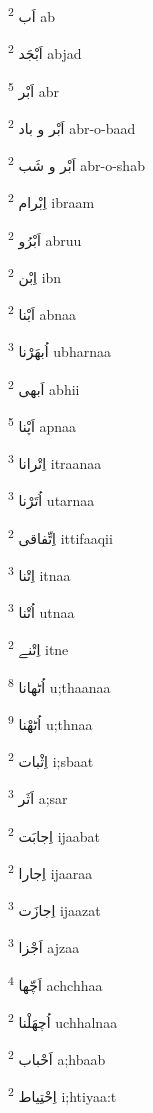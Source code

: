 \documentclass[12pt]{article}
\begin{document}
\setRTL
\raggedleft
 
\begin{multicols}{5}
{\ur اَب}   \textsuperscript{2} ab

{\ur اَبْجَد}   \textsuperscript{2} abjad

{\ur اَبْر}   \textsuperscript{5} abr

{\ur اَبْر و باد}   \textsuperscript{2} abr-o-baad

{\ur اَبْر و شَب}   \textsuperscript{2} abr-o-shab

{\ur اِبْرام}   \textsuperscript{2} ibraam

{\ur اَبْرُو}   \textsuperscript{2} abruu

{\ur اِبْن}   \textsuperscript{2} ibn

{\ur اَبْنا}   \textsuperscript{2} abnaa

{\ur اُبھَرْنا}   \textsuperscript{3} ubharnaa

{\ur اَبھی}   \textsuperscript{2} abhii

{\ur اَپْنا}   \textsuperscript{5} apnaa

{\ur اِتْرانا}   \textsuperscript{3} itraanaa

{\ur اُتَرْنا}   \textsuperscript{3} utarnaa

{\ur اِتِّفاقی}   \textsuperscript{2} ittifaaqii

{\ur اِتْنا}   \textsuperscript{3} itnaa

{\ur اُتْنا}   \textsuperscript{3} utnaa

{\ur اِتْنے}   \textsuperscript{2} itne

{\ur اُٹھانا}   \textsuperscript{8} u;thaanaa

{\ur اُٹھْنا}   \textsuperscript{9} u;thnaa

{\ur اِثْبات}   \textsuperscript{2} i;sbaat

{\ur اَثَر}   \textsuperscript{3} a;sar

{\ur اِجابَت}   \textsuperscript{2} ijaabat

{\ur اِجارا}   \textsuperscript{2} ijaaraa

{\ur اِجازَت}   \textsuperscript{3} ijaazat

{\ur اَجْزا}   \textsuperscript{3} ajzaa

{\ur اَچّھا}   \textsuperscript{4} achchhaa

{\ur اُچھَلْنا}   \textsuperscript{2} uchhalnaa

{\ur اَحْباب}   \textsuperscript{2} a;hbaab

{\ur اِحْتِیاط}   \textsuperscript{2} i;htiyaa:t


\end{multicols}
\end{document}
